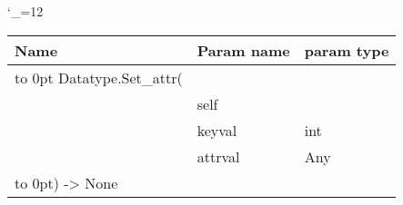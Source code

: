\begingroup \catcode`\_=12 \tt
\begin{tabular}{lll}
\toprule
\textrm{Name}&\textrm{Param name}&\textrm{param type}\\
\midrule
\hbox to 0pt {Datatype.Set_attr(\hss}\\
& self\\
& keyval & int\\
& attrval & Any\\
\hbox to 0pt{) -> None\hss}\\
\bottomrule
\end{tabular}
\endgroup
